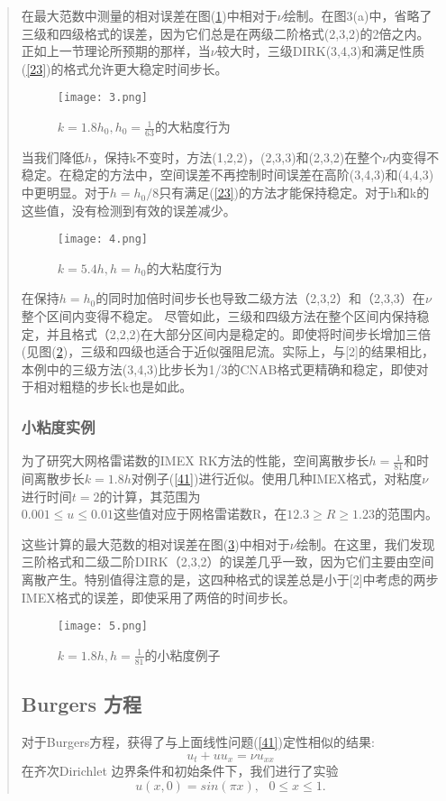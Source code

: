 \documentclass{article}
\begin{document}
\begin{CJK}{UTF8}{gkai}
\begin{quotation}
在最大范数中测量的相对误差在图(\ref{figures3})中相对于$\nu$绘制。在图3(a)中，省略了三级和四级格式的误差，因为它们总是在两级二阶格式(2,3,2)的2倍之内。正如上一节理论所预期的那样，当$\nu$较大时，三级DIRK(3,4,3)和满足性质(\ref{23})的格式允许更大稳定时间步长。
\begin{figure}[H]
\texttt{[image: 3.png]}
\caption{$k=1.8h_{0},h_{0}=\frac{1}{63}$的大粘度行为}
\centering
\label{figures3}
\end{figure}

当我们降低$h$，保持k不变时，方法(1,2,2)，(2,3,3)和(2,3,2)在整个$\nu $内变得不稳定。在稳定的方法中，空间误差不再控制时间误差在高阶(3,4,3)和(4,4,3)中更明显。对于$h=h_{0}/8$只有满足(\ref{23})的方法才能保持稳定。对于h和k的这些值，没有检测到有效的误差减少。
\begin{figure}[H]
\texttt{[image: 4.png]}
\caption{$k=5.4h,h=h_{0}$的大粘度行为}
\centering
\label{figures4}
\end{figure}

在保持$h=h_{0}$的同时加倍时间步长也导致二级方法（2,3,2）和（2,3,3）在$\nu$整个区间内变得不稳定。 尽管如此，三级和四级方法在整个区间内保持稳定，并且格式（2,2,2)在大部分区间内是稳定的。即使将时间步长增加三倍(见图(\ref{figures4})，三级和四级也适合于近似强阻尼流。实际上，与[2]的结果相比，本例中的三级方法(3,4,3)比步长为1/3的CNAB格式更精确和稳定，即使对于相对粗糙的步长k也是如此。

\subsubsection{小粘度实例}

为了研究大网格雷诺数的IMEX RK方法的性能，空间离散步长$h=\frac{1}{81}$和时间离散步长$k=1.8h$对例子(\ref{41})进行近似。使用几种IMEX格式，对粘度$\nu $进行时间$t = 2$的计算，其范围为\\$0.001\le u\le 0.01$这些值对应于网格雷诺数R，在$12.3\ge R \ge 1.23$的范围内。

这些计算的最大范数的相对误差在图(\ref{figures5})中相对于$\nu$绘制。在这里，我们发现三阶格式和二级二阶DIRK（2,3,2）的误差几乎一致，因为它们主要由空间离散产生。特别值得注意的是，这四种格式的误差总是小于[2]中考虑的两步IMEX格式的误差，即使采用了两倍的时间步长。

\begin{figure}[H]
\texttt{[image: 5.png]}
\caption{$k=1.8h,h=\frac{1}{81}$的小粘度例子}
\centering
\label{figures5}
\end{figure}

\subsection{Burgers 方程}
对于Burgers方程，获得了与上面线性问题(\ref{41})定性相似的结果:
\begin{equation}
u_{t}+uu_{x}=\nu u_{xx}
\end{equation}
在齐次Dirichlet 边界条件和初始条件下，我们进行了实验
\begin{equation*}
u(x,0)=sin(\pi x),~~~0\le x\le 1.
\end{equation*}


\end{quotation}
\end{CJK}
\end{document}

